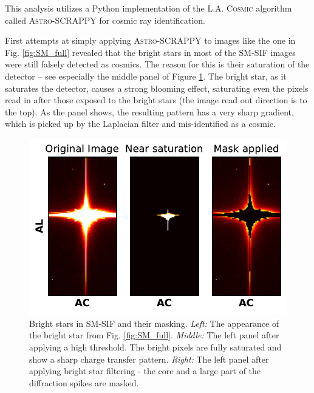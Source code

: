 \documentclass[a4paper, 11pt]{article}
\begin{document}
This analysis utilizes a Python implementation of the \textsc{L.A. Cosmic} algorithm called \textsc{Astro-SCRAPPY} \cite{astroscrappy} for cosmic ray identification.

First attempts at simply applying \textsc{Astro-SCRAPPY} to images like the one in Fig. \ref{fig:SM_full} revealed that the bright stars in most of the SM-SIF images were still falsely detected as cosmics. The reason for this is their saturation of the detector -- see especially the middle panel of Figure \ref{fig:SM_starmask}. The bright star, as it saturates the detector, causes a strong blooming effect, saturating even the pixels read in after those exposed to the bright stars (the image read out direction is to the top). As the panel shows, the resulting pattern has a very sharp gradient, which is picked up by the Laplacian filter and mis-identified as a cosmic.

\begin{figure}
  \centering
  \includegraphics{images/SM_starmask}
  \caption{Bright stars in SM-SIF and their masking. \textit{Left:} The appearance of the bright star from Fig. \ref{fig:SM_full}. \textit{Middle:} The left panel after applying a high threshold. The bright pixels are fully saturated and show a sharp charge transfer pattern. \textit{Right:} The left panel after applying bright star filtering - the core and a large part of the diffraction spikes are masked.}
  \label{fig:SM_starmask}
\end{figure}
\end{document}
